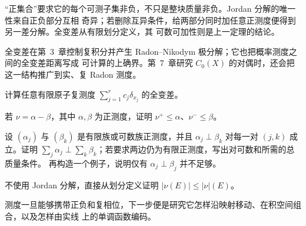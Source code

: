 \begin{remark}
“正集合”要求它的每个可测子集非负，不只是整块质量非负。Jordan 分解的唯一性来自正负部分互相
奇异；若删除互异条件，给两部分同时加任意正测度便得到另一差分解。全变差从有限划分定义，其
可数可加性则是上一定理的结论。
\end{remark}

全变差在第~3~章控制复积分并产生 Radon--Nikodym 极分解；它也把概率测度之间的全变差距离写成
可计算的上确界。第~7~章研究 \(C_0(X)\) 的对偶时，还会把这一结构推广到实、复 Radon 测度。

\begin{exercise}
计算任意有限原子复测度 $\sum_{j=1}^rc_j\delta_{x_j}$ 的全变差。
\end{exercise}
\begin{exercise}
若 $\nu=\alpha-\beta$，其中 $\alpha,\beta$ 为正测度，证明
$\nu^+\le\alpha$、$\nu^-\le\beta$。
\end{exercise}
\begin{exercise}
设 $(\alpha_j)$ 与 $(\beta_k)$ 是有限族或可数族正测度，并且
$\alpha_j\perp\beta_k$ 对每一对 $(j,k)$ 成立。证明
$\sum_j\alpha_j\perp\sum_k\beta_k$；若要求两边仍为有限正测度，写出对可数和所需的总质量条件。
再构造一个例子，说明仅有 $\alpha_j\perp\beta_j$ 并不足够。
\end{exercise}
\begin{exercise}
不使用 Jordan 分解，直接从划分定义证明 $|\nu(E)|\le|\nu|(E)$。
\end{exercise}

测度一旦能够携带正负和复相位，下一步便是研究它怎样沿映射移动、在积空间组合，以及怎样由实线
上的单调函数编码。
